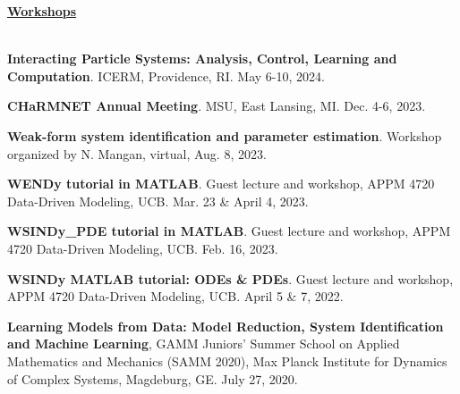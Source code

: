 \documentclass[letterpaper,11pt,oneside]{article}
\newcommand{\headr}[1]{\vspace{10pt}\uline{\Large{\textbf{#1}} \hfill } \\ \vspace{-10pt}\\}
\begin{document}
\headr{Workshops}
\vspace{-0.5cm}
\begin{enumerate}[label={[\arabic*]}]
\item \textbf{Interacting Particle Systems: Analysis, Control, Learning and Computation}. ICERM, Providence, RI. May 6-10, 2024.
\item \textbf{CHaRMNET Annual Meeting}. MSU, East Lansing, MI. Dec. 4-6, 2023.
\item \textbf{Weak-form system identification and parameter estimation}. Workshop organized by N. Mangan, virtual, Aug. 8, 2023.
\item \textbf{WENDy tutorial in MATLAB}. Guest lecture and workshop, APPM 4720 Data-Driven Modeling, UCB. Mar. 23 \& April 4, 2023.
\item \textbf{WSINDy\_PDE tutorial in MATLAB}. Guest lecture and workshop, APPM 4720 Data-Driven Modeling, UCB. Feb. 16, 2023.
\item \textbf{WSINDy MATLAB tutorial: ODEs \& PDEs}. Guest lecture and workshop, APPM 4720 Data-Driven Modeling, UCB. April 5 \& 7, 2022.
\item \textbf{Learning Models from Data: Model Reduction, System Identification and Machine Learning}, GAMM Juniors' Summer School on Applied Mathematics and Mechanics (SAMM 2020), Max Planck Institute for Dynamics of Complex Systems, Magdeburg, GE. July 27, 2020.
\end{enumerate}
\end{document}
